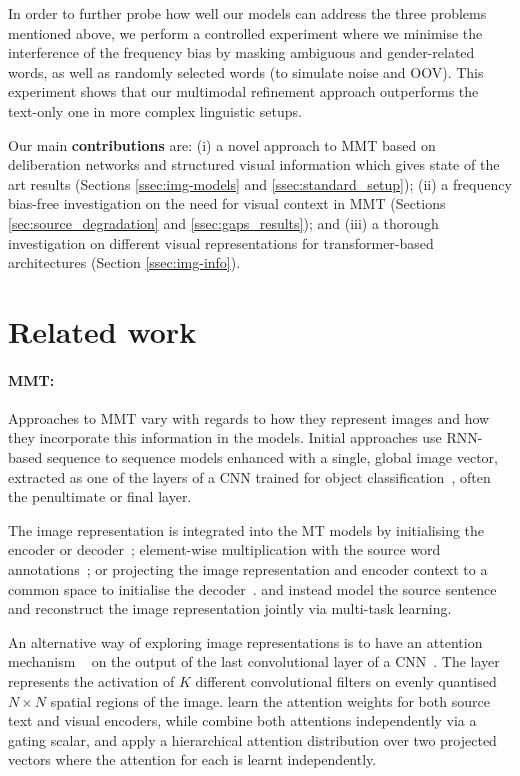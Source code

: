 \documentclass[11pt,a4paper]{article}
\begin{document}
In order to further probe how well our models can address the three problems mentioned above,
we perform a controlled experiment where we minimise the interference of the frequency bias by masking ambiguous and gender-related words, as well as randomly selected words (to simulate noise and OOV). This experiment shows that our multimodal refinement approach outperforms the text-only one in more complex linguistic setups. 

Our main {\bf contributions} are: (i) a novel approach to MMT based on deliberation networks and structured visual information which gives state of the art results (Sections \ref{ssec:img-models} and \ref{ssec:standard_setup}); (ii) a frequency bias-free investigation on the need for visual context in MMT (Sections \ref{sec:source_degradation} and \ref{ssec:gaps_results}); and (iii) a thorough investigation on different visual representations for transformer-based architectures (Section \ref{ssec:img-info}). 
 

 
\section{Related work}\label{sec:related}

\paragraph{MMT:} Approaches to MMT vary with regards to how they represent images and how they incorporate this information in the models. Initial approaches use RNN-based sequence to sequence models \cite{BahdanauEtAl:2015} enhanced with a single, global image vector, extracted as one of the layers of a CNN trained for object classification~\cite{he2016deep}, often the penultimate or final layer. 

The image representation is integrated into the MT models by initialising the encoder or  decoder~\cite{ElliottEtAl:2015,CaglayanEtAl:2017,MadhyasthaEtAl:2017}; element-wise multiplication with the source word annotations~\cite{CaglayanEtAl:2017}; or  projecting the image representation and encoder context  to a common space to initialise the  decoder~\cite{CalixtoLiu:2017}.  and  instead model the source sentence and reconstruct the image representation jointly via multi-task learning. 

An alternative way of exploring image representations is to have an attention mechanism ~\cite{BahdanauEtAl:2015} on the output of the last convolutional layer of a CNN~\cite{XuEtAl:2015}. 
The layer represents the activation of $K$ different convolutional filters on evenly quantised $N \times N$ spatial regions of the image.   learn the attention weights for both source text and visual encoders, while   combine both attentions independently via a gating scalar, and    apply a hierarchical attention distribution over two projected vectors where the attention for each is learnt independently.
\end{document}
